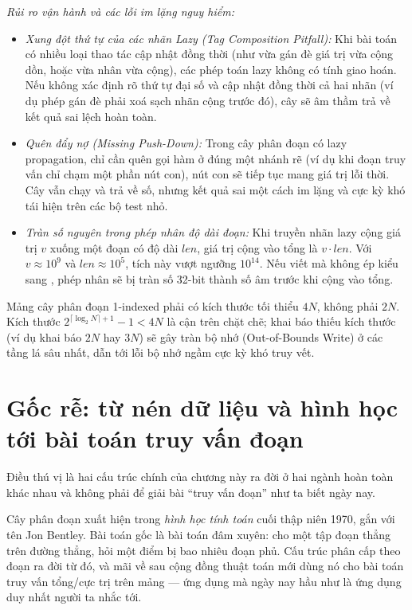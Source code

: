 \documentclass[../../algorithm.tex]{subfiles}
\begin{document}
\emph{Rủi ro vận hành và các lỗi im lặng nguy hiểm:}
\begin{itemize}
\item \emph{Xung đột thứ tự của các nhãn Lazy (Tag Composition Pitfall):} Khi bài toán có nhiều loại thao tác cập nhật đồng thời (như vừa gán đè giá trị vừa cộng dồn, hoặc vừa nhân vừa cộng), các phép toán lazy không có tính giao hoán. Nếu không xác định rõ thứ tự đại số và cập nhật đồng thời cả hai nhãn (ví dụ phép gán đè phải xoá sạch nhãn cộng trước đó), cây sẽ âm thầm trả về kết quả sai lệch hoàn toàn.
\item \emph{Quên đẩy nợ (Missing Push-Down):} Trong cây phân đoạn có lazy propagation, chỉ cần quên gọi hàm  ở đúng một nhánh rẽ (ví dụ khi đoạn truy vấn chỉ chạm một phần nút con), nút con sẽ tiếp tục mang giá trị lỗi thời. Cây vẫn chạy và trả về số, nhưng kết quả sai một cách im lặng và cực kỳ khó tái hiện trên các bộ test nhỏ.
\item \emph{Tràn số nguyên trong phép nhân độ dài đoạn:} Khi truyền nhãn lazy cộng giá trị \(v\) xuống một đoạn có độ dài \(len\), giá trị cộng vào tổng là \(v \cdot len\). Với \(v \approx 10^9\) và \(len \approx 10^5\), tích này vượt ngưỡng \(10^{14}\). Nếu viết  mà không ép kiểu sang , phép nhân sẽ bị tràn số 32-bit thành số âm trước khi cộng vào tổng.
\end{itemize}

\begin{cambay}
Mảng cây phân đoạn 1-indexed phải có kích thước tối thiểu \(4N\), không phải \(2N\). Kích thước \(2^{\lceil\log_2 N\rceil + 1} - 1 < 4N\) là cận trên chặt chẽ; khai báo thiếu kích thước (ví dụ khai báo \(2N\) hay \(3N\)) sẽ gây tràn bộ nhớ (Out-of-Bounds Write) ở các tầng lá sâu nhất, dẫn tới lỗi bộ nhớ ngầm cực kỳ khó truy vết.
\end{cambay}

\section{Gốc rễ: từ nén dữ liệu và hình học tới bài toán truy vấn đoạn}

Điều thú vị là hai cấu trúc chính của chương này ra đời ở hai ngành hoàn toàn khác nhau và không phải để giải bài ``truy vấn đoạn'' như ta biết ngày nay.

Cây phân đoạn xuất hiện trong \emph{hình học tính toán} cuối thập niên 1970, gắn với tên Jon Bentley. Bài toán gốc là bài toán đâm xuyên: cho một tập đoạn thẳng trên đường thẳng, hỏi một điểm bị bao nhiêu đoạn phủ. Cấu trúc phân cấp theo đoạn ra đời từ đó, và mãi về sau cộng đồng thuật toán mới dùng nó cho bài toán truy vấn tổng/cực trị trên mảng --- ứng dụng mà ngày nay hầu như là ứng dụng duy nhất người ta nhắc tới.
\end{document}

